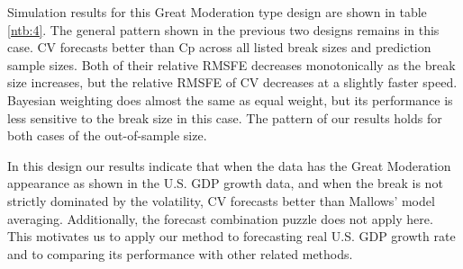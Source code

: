 Simulation results for this Great Moderation type design are shown in table \ref{ntb:4}. The general pattern shown in the previous two designs remains in this case. CV forecasts better than Cp across all listed break sizes and prediction sample sizes. Both of their relative RMSFE decreases monotonically as the break size increases, but the relative RMSFE of CV decreases at a slightly faster speed. Bayesian weighting does almost the same as equal weight, but its performance is less sensitive to the break size in this case. The pattern of our results holds for both cases of the out-of-sample size.

In this design our results indicate that when the data has the Great Moderation appearance as shown in the U.S. GDP growth data, and when the break is not strictly dominated by the volatility, CV forecasts better than Mallows' model averaging. Additionally, the forecast combination puzzle does not apply here. This motivates us to apply our method to forecasting real U.S. GDP growth rate and to comparing its performance with other related methods.
